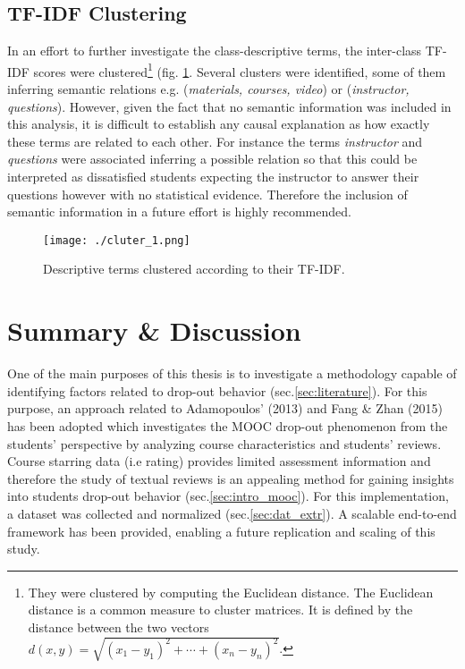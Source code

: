 \documentclass[
	a4paper,
	pdftex,
	12pt,	
	footinclude=true,
	fleqn,
	final,
	]{report}%
\begin{document}
\subsection*{TF-IDF Clustering}
\vspace{-0.45cm}
In an effort to further investigate the class-descriptive terms,
the inter-class TF-IDF scores were clustered\footnote{ 
They were clustered by computing the Euclidean distance.
The Euclidean distance is a common measure to
cluster matrices. It is defined by the 
distance between the two vectors
$d(x,y)=\sqrt{(x_{1}-y_{1})^{2}+\cdots+(x_{n}-y_{n})^{2}}$.}
(fig. \ref{fig:18}. Several clusters were identified, some of them inferring
semantic relations e.g. (\emph{materials, courses, video}) or 
(\emph{instructor, questions}). However, given the fact that no 
semantic information was included in this analysis, it is 
difficult to establish any causal explanation 
as how exactly these terms are related to each other. 
For instance the terms \emph{instructor} and \emph{questions} were associated 
inferring a possible relation so that this could be interpreted as 
dissatisfied students expecting the instructor to answer 
their questions however with no statistical evidence. 
Therefore the inclusion of semantic information in a 
future effort is highly recommended.

\begin{figure}[h]
 \centering
 \texttt{[image: ./cluter\_1.png]}
\caption{Descriptive terms clustered according to their TF-IDF. }
 \label{fig:18}
\end{figure}

\vspace{-0.45cm}
\section{Summary \& Discussion}
\label{sec:discussion}
\vspace{-0.3cm}

One of the main purposes of this thesis is to investigate a methodology capable of 
identifying factors related to drop-out behavior (sec.\ref{sec:literature}). 
For this purpose, an approach related to Adamopoulos' (2013) and Fang \& Zhan (2015)
has been adopted which investigates the MOOC drop-out phenomenon from the students' 
perspective by analyzing course characteristics and students' reviews. Course starring 
data (i.e rating) provides limited assessment information \cite{Hayes2015,Conole2013}
and therefore the study of textual reviews is an appealing method 
for gaining insights into students drop-out behavior (sec.\ref{sec:intro_mooc}). 
For this implementation, a dataset was collected 
and normalized (sec.\ref{sec:dat_extr}). A scalable end-to-end framework 
has been provided, enabling a future replication and scaling of this study. 
\end{document}

